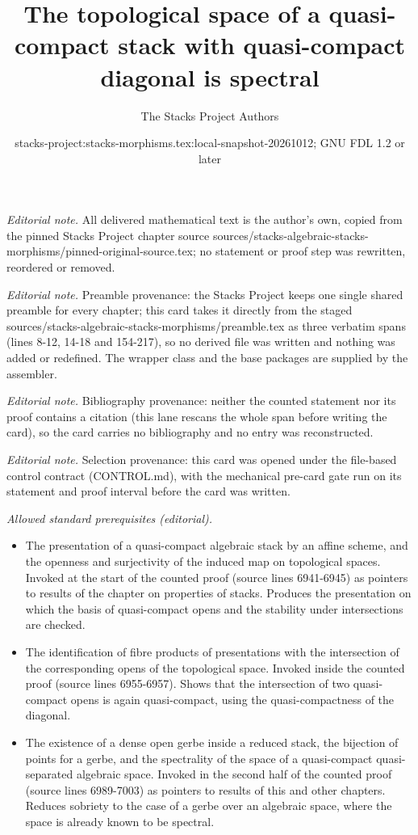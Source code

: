 \documentclass[10pt,a4paper]{amsart}
\title{The topological space of a quasi-compact stack with quasi-compact diagonal is spectral}
\author{The Stacks Project Authors}
\date{stacks-project:stacks-morphisms.tex:local-snapshot-20261012; GNU FDL 1.2 or later}
\theoremstyle{plain}
\theoremstyle{definition}
\theoremstyle{remark}
\numberwithin{equation}{subsection}
\begin{document}
\maketitle
\noindent\textit{Editorial note.} All delivered mathematical text is the author's own, copied from the pinned Stacks Project chapter source sources/stacks-algebraic-stacks-morphisms/pinned-original-source.tex; no statement or proof step was rewritten, reordered or removed.\par\medskip
\noindent\textit{Editorial note.} Preamble provenance: the Stacks Project keeps one single shared preamble for every chapter; this card takes it directly from the staged sources/stacks-algebraic-stacks-morphisms/preamble.tex as three verbatim spans (lines 8-12, 14-18 and 154-217), so no derived file was written and nothing was added or redefined. The wrapper class and the base packages are supplied by the assembler.\par\medskip
\noindent\textit{Editorial note.} Bibliography provenance: neither the counted statement nor its proof contains a citation (this lane rescans the whole span before writing the card), so the card carries no bibliography and no entry was reconstructed.\par\medskip
\noindent\textit{Editorial note.} Selection provenance: this card was opened under the file-based control contract (CONTROL.md), with the mechanical pre-card gate run on its statement and proof interval before the card was written.\par\medskip
\noindent\textit{Allowed standard prerequisites (editorial).}\begin{itemize}
\item The presentation of a quasi-compact algebraic stack by an affine scheme, and the openness and surjectivity of the induced map on topological spaces. Invoked at the start of the counted proof (source lines 6941-6945) as pointers to results of the chapter on properties of stacks. Produces the presentation on which the basis of quasi-compact opens and the stability under intersections are checked.
\item The identification of fibre products of presentations with the intersection of the corresponding opens of the topological space. Invoked inside the counted proof (source lines 6955-6957). Shows that the intersection of two quasi-compact opens is again quasi-compact, using the quasi-compactness of the diagonal.
\item The existence of a dense open gerbe inside a reduced stack, the bijection of points for a gerbe, and the spectrality of the space of a quasi-compact quasi-separated algebraic space. Invoked in the second half of the counted proof (source lines 6989-7003) as pointers to results of this and other chapters. Reduces sobriety to the case of a gerbe over an algebraic space, where the space is already known to be spectral.
\end{itemize}\medskip
\end{document}
